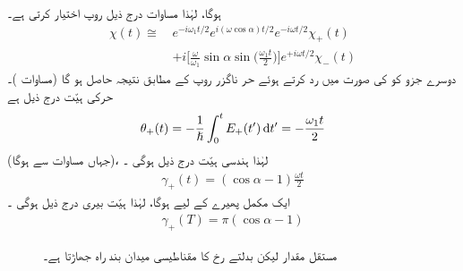 ہوگا،  لہٰذا مساوات  درج ذیل روپ اختیار کرتی ہے۔ 
\begin{align}
\chi (t) \cong \,&e^{- i \omega_1 t/2} e^{i (\omega \cos \alpha) t/2} e^{- i \omega t/2} \chi_+(t) \nonumber\\
&+i \big [ \frac{\omega}{\omega_1} \sin \alpha \sin \big ( \frac{\omega_1 t}{2} \big ) \big ]e^{+ i \omega t/2} \chi_{-} (t)
\end{align}
دوسرے جزو کو   کی صورت میں رد کرتے ہوئے حر ناگزر روپ کے مطابق  نتیجہ حاصل ہو گا (مساوات  )۔ حرکی ہیّت درج ذیل ہے 
\begin{align}
\theta_+ (t) = - \frac{1}{\hslash} \int_0^t E_+ (t') \dif t' = - \frac{\omega_1 t}{2}
\end{align}
(جہاں مساوات  سے  ہوگا)،  لہٰذا ہندسی ہیّت درج ذیل ہوگی ۔
\begin{align}
\gamma_+ (t) = (\cos \alpha - 1) \frac{\omega t}{2}
\end{align}
ایک مکمل پھیرے کے لیے  ہوگا،  لہٰذا ہیّت بیری درج ذیل ہوگی ۔
\begin{align}\label{مساوات_حر_گاما}
\gamma_+ (T) = \pi (\cos \alpha - 1)
\end{align}

\begin{figure}
\centering
{}
\caption{مستقل  مقدار لیکن بدلتے رخ کا مقناطیسی میدان بند راہ   جھاڑتا  ہے۔}
\label{شکل_حرارت_نا_گزر_مقناطیسی_میدان_بند_راہ}
\end{figure}

